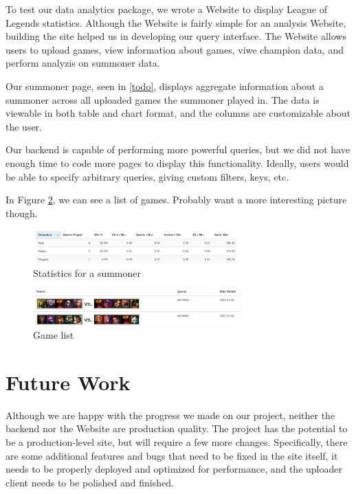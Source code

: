 \documentclass[letterpaper,twocolumn,9pt]{article}
\begin{document}
To test our data analytics package, we wrote a Website to display League of Legends statistics. Although the Website is fairly simple for an analysis Website, building the site helped us in developing our query interface. The Website allows users to upload games, view information about games, viwe champion data, and perform analyzis on summoner data.

Our summoner page, seen in \ref{todo}, displays aggregate information about a summoner across all uploaded games the summoner played in. The data is viewable in both table and chart format, and the columns are customizable about the user.

Our backend is capable of performing more powerful queries, but we did not have enough time to code more pages to display this functionality. Ideally, users would be able to specify arbitrary queries, giving custom filters, keys, etc. 

In Figure \ref{list}, we can see a list of games. Probably want a more interesting picture though.

\begin{figure}[h]
    \includegraphics[width=80mm]{imgs/stats.png}
    \caption{Statistics for a summoner}
    \label{chart}
\end{figure}

\begin{figure}[h]
    \includegraphics[width=80mm]{imgs/gamelist.png}
    \caption{Game list}
    \label{list}
\end{figure}

\section{Future Work}
\label{future}

Although we are happy with the progress we made on our project, neither the backend nor the Website are production quality.   The project has the potential to be a production-level site, but will require a few more changes.  Specifically, there are some additional features and bugs that need to be fixed in the site itself, it needs to be properly deployed and optimized for performance, and the uploader client needs to be polished and finished.
\end{document}
